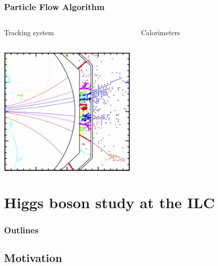 \documentclass{beamer}
\begin{document}
\begin{frame}
  \frametitle{Particle Flow Algorithm}

    \begin{columns}[t]
      \begin{column}{3cm}
        Tracking system
      \end{column}
      \begin{column}{3cm}
        Calorimeters
      \end{column}
    \end{columns}
  \begin{center}
    \includegraphics[width = 0.5\textwidth]{Pictures/ild_particleFlowConcept.png}
  \end{center}
\end{frame}
  
\section{Higgs boson study at the ILC}
  \begin{frame}
    \frametitle{Outlines}
    \begin{minipage}{\textwidth}
      \tableofcontents[currentsection,hideothersubsections, 
      sectionstyle=show/shaded,]
    \end{minipage}
  \end{frame}

  \subsection{Motivation}
\end{document}
